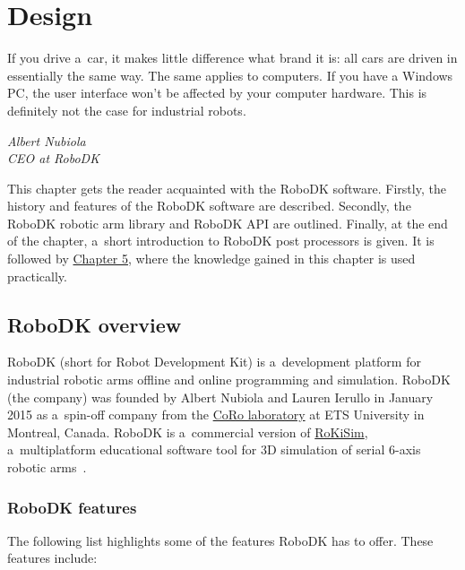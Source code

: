 \chapter{Design \label{chap:design}}



\epigraph{If you drive a~car, it makes little difference what brand it is: all cars are driven
in essentially the same way. The same applies to computers. If you have a
Windows PC, the user interface won’t be affected by your computer hardware.
This is definitely not the case for industrial robots.}{\textit{Albert Nubiola \\ CEO at RoboDK}}

\par This chapter gets the reader acquainted with the RoboDK software. Firstly, the history and features of the RoboDK software are described. Secondly, the RoboDK robotic arm library and RoboDK API are outlined. Finally, at the end of the chapter, a~short introduction to RoboDK post processors is given. It is followed by  \hyperref[chap:implementation]{Chapter 5}, where the knowledge gained in this chapter is used practically. 

\section{RoboDK overview}

RoboDK (short for Robot Development Kit) is a~development platform for industrial robotic arms offline and online programming and simulation. 
RoboDK (the company) was founded by Albert Nubiola and Lauren Ierullo in January 2015 as a~spin-off company from the \href{https://en.etsmtl.ca/unites-de-recherche/coro/accueil?lang=en-CA}{CoRo laboratory}   at ETS University in Montreal, Canada. RoboDK is a~commercial version of \href{https://www.parallemic.org/RoKiSim.html}{RoKiSim}, a~multiplatform educational software tool for 3D simulation of serial 6-axis robotic arms~\cite{robodkoverview}.

\subsection{RoboDK features}

The following list highlights some of the features RoboDK has to offer. These features include: 

